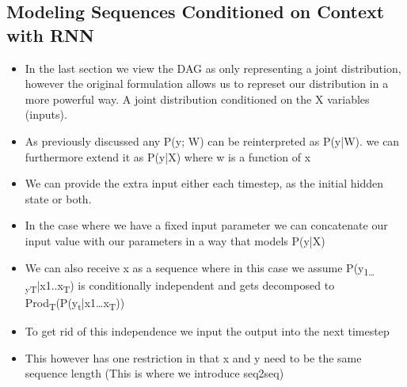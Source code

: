 \documentclass[11pt]{article}
\begin{document}
\subsection{Modeling Sequences Conditioned on Context with RNN}
\label{sec:org56fec98}
\begin{itemize}
\item In the last section we view the DAG as only representing a joint distribution, however the original formulation allows us to represet our distribution in a more powerful way. A joint distribution conditioned on the X variables (inputs).
\item As previously discussed any P(y; W) can be reinterpreted as P(y|W). we can furthermore extend it as P(y|X) where w is a function of x
\item We can provide the extra input either each timestep, as the initial hidden state or both.
\item In the case where we have a fixed input parameter we can concatenate our input value with our parameters in a way that models P(y|X)
\item We can also receive x as a sequence where in this case we assume P(y\textsubscript{1\ldots{}y}\textsubscript{T}|x1..x\textsubscript{T}) is conditionally independent and gets decomposed to Prod\textsubscript{T}(P(y\textsubscript{t}|x1\ldots{}x\textsubscript{T}))
\item To get rid of this independence we input the output into the next timestep
\item This however has one restriction in that x and y need to be the same sequence length (This is where we introduce seq2seq)
\end{itemize}
\end{document}

